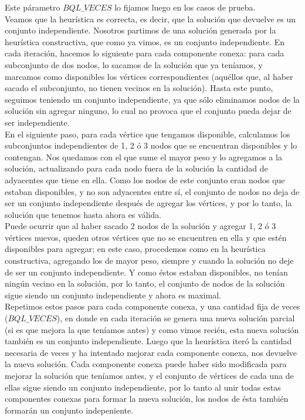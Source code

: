 \documentclass[a4paper, 10pt]{article}
\begin{document}
Este p\'arametro $BQL\_VECES$ lo fijamos luego en los casos de prueba. \\

Veamos que la heur\'istica es correcta, es decir, que la soluci\'on que devuelve es un conjunto independiente. Nosotros partimos de una soluci\'on generada por la heur\'istica constructiva, que como ya vimos, es un conjunto independiente. En cada iteraci\'on, hacemos lo siguiente para cada componente conexa: para cada subconjunto de dos nodos, lo sacamos de la soluci\'on que ya ten\'iamos, y marcamos como disponibles los v\'ertices correspondientes (aqu\'ellos que, al haber sacado el subconjunto, no tienen vecinos en la soluci\'on). Hasta este punto, seguimos teniendo un conjunto independiente, ya que s\'olo eliminamos nodos de la soluci\'on sin agregar ninguno, lo cual no provoca que el conjunto pueda dejar de ser independiente. \\

En el siguiente paso, para cada v\'ertice que tengamos disponible, calculamos los subconjuntos independientes de 1, 2 \'o 3 nodos que se encuentran disponibles y lo contengan. Nos quedamos con el que sume el mayor peso y lo agregamos a la soluci\'on, actualizando para cada nodo fuera de la soluci\'on la cantidad de adyacentes que tiene en ella. Como los nodos de este conjunto eran nodos que estaban disponibles, y no son adyacentes entre s\'i, el conjunto de nodos no deja de ser un conjunto independiente despu\'es de agregar los v\'ertices, y por lo tanto, la soluci\'on que tenemos hasta ahora es v\'alida. \\

Puede ocurrir que al haber sacado 2 nodos de la soluci\'on y agregar 1, 2 \'o 3 v\'ertices nuevos, queden otros v\'ertices que no se encuentren en ella y que est\'en disponibles para agregar; en este caso, procedemos como en la heur\'istica constructiva, agregando los de mayor peso, siempre y cuando la soluci\'on no deje de ser un conjunto independiente. Y como \'estos estaban disponibles, no ten\'ian ning\'un vecino en la soluci\'on, por lo tanto, el conjunto de nodos de la soluci\'on sigue siendo un conjunto independiente y ahora es maximal. \\

Repetimos estos pasos para cada componente conexa, y una cantidad fija de veces ($BQL\_VECES$), en donde en cada iteraci\'on se genera una nueva soluci\'on parcial (si es que mejora la que ten\'iamos antes) y como vimos reci\'en, esta nueva soluci\'on tambi\'en es un conjunto independiente. Luego que la heur\'istica iter\'o la cantidad necesaria de veces y ha intentado mejorar cada componente conexa, nos devuelve la nueva soluci\'on. Cada componente conexa puede haber sido modificada para mejorar la soluci\'on que ten\'iamos antes, y el conjunto de v\'ertices de cada una de ellas sigue siendo un conjunto independiente, por lo tanto al unir todas estas componentes conexas para formar la nueva soluci\'on, los nodos de \'esta tambi\'en formar\'an un conjunto indepeniente. 
\end{document}
